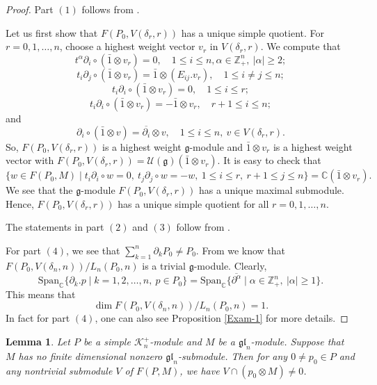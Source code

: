 \documentclass[12pt, a4paper]{amsart}
\newcommand{\fg}{\mathfrak g}
\newcommand{\C}{\mathbb{C}}
\newcommand{\Z}{\mathbb Z}
\newcommand{\U}{\mathcal{U}}
\def\gl{\mathfrak{gl}}
\theoremstyle{Theorem}
\theoremstyle{Theorem}
\newtheorem{lemma}[thm]{Lemma}
\numberwithin{equation}{section}
\begin{document}
\begin{proof}
Part $(1)$ follows from \cite[Theorem 3.1]{LLZ}.

Let us first show that  $F(P_{0},V(\delta_{r},r))$
has a unique simple quotient.  For $r=0,1,\dots,n$, choose a highest weight vector $v_{r}$ in $V(\delta_{r},r)$. We compute that
\[t^{\alpha}\partial_{i}\circ(\bar{1}\otimes v_{r})=0,\quad   1\leq i\leq n, \alpha\in\Z_{+}^{n},\ |\alpha|\geq2;\]
\[t_{i}\partial_{j}\circ(\bar{1}\otimes v_{r})=\bar{1}\otimes (E_{ij}.v_{r}),\quad 1\leq i\neq j\leq n;\]
\[t_{i}\partial_{i}\circ(\bar{1}\otimes v_{r})=0,\quad 1\leq i\leq r;\]
\[t_{i}\partial_{i}\circ(\bar{1}\otimes v_{r})=-\bar{1}\otimes v_{r},\quad r+1\leq i\leq n;\]
and
\[\partial_{i}\circ(\bar{1}\otimes v)=\overline{\partial_{i}}\otimes v,\quad 1\leq i\leq n,\ v\in V(\delta_{r},r).\]
So, $F(P_{0},V(\delta_{r},r))$ is a highest weight $\fg$-module and $\bar{1}\otimes v_{r}$ is a
highest weight vector with $F(P_{0},V(\delta_{r},r))=\U(\fg)(\bar{1}\otimes v_{r})$. It is easy to check that \[\{w\in F(P_{0},M)\mid t_{i}\partial_{i}\circ w=0,\ t_{j}\partial_{j}\circ w=-w,\ 1\leq i\leq r,\ r+1\leq j\leq n\}=\C (\bar{1}\otimes v_{r}).\] We see that the $\fg$-module $F(P_{0},V(\delta_{r},r))$ has a unique maximal submodule. Hence, $F(P_{0},V(\delta_{r},r))$
has a unique simple quotient for all $r=0,1,\dots,n$.

The statements in part $(2)$ and $(3)$ follow from \cite[Theorem 3.5 (2)]{LLZ}.

For part $(4)$, we see that $\sum^n
_{k=1} \partial_kP_0 \ne P_0. $   From \cite[Theorem 3.5 (5)]{LLZ} we know that $F(P_{0},V(\delta_{n},n))/L_{n}(P_{0},n)$ is a trivial $\fg$-module. Clearly,   \[\text{Span}_{\C}\{\partial_{k}.p\mid k=1,2,\dots,n,\ p\in P_{0}\}=\text{Span}_{\C}\{\overline{\partial^{\alpha}}\mid \alpha\in\Z_{+}^{n},\ |\alpha|\geq1\}.\] This means that 
\[\dim F(P_{0},V(\delta_{n},n))/L_{n}(P_{0},n)=1.\]
In fact for part $(4)$, one can also see Proposition \ref{Exam-1} for more details.
\end{proof}






\begin{lemma}\label{key-l=1} Let $P$ be a simple $\mathcal{K}_n^+$-module and $M$ be a $\gl_n$-module.
	Suppose that $M$ has no finite dimensional nonzero $\mathfrak{gl}_n$-submodule. Then for any $0\ne p_0\in P$
	and any nontrivial submodule $V$ of $F(P,M)$, we have $V\cap(p_0\otimes M)\ne 0$.\end{lemma}
\end{document}
